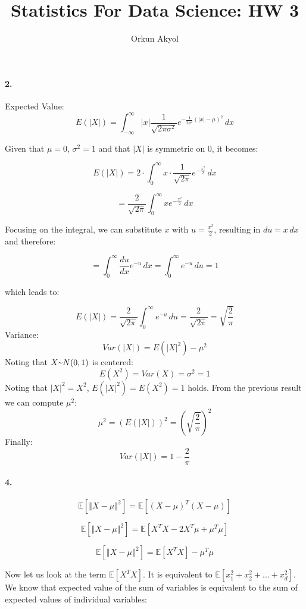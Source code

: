 \documentclass[10pt,letterpaper]{article}
\author{Orkun Akyol}
\title{Statistics For Data Science: HW 3}
\newcommand{\mytexttilde}{\raisebox{0.5ex}{\texttildelow}}
\begin{document}
\paragraph{2.}
Expected Value:
\[
E(|X|) = \int_{-\infty}^{\infty} |x| \frac{1}{\sqrt{2 \pi \sigma^2}} e^{-\frac{1}{2 \sigma^2} (|x| - \mu)^2} \, dx
\]

Given that \( \mu = 0 \), \( \sigma^2 = 1 \) and that \( |X| \) is symmetric on \( 0 \), it becomes:

\[
E(|X|) = 2 \cdot \int_{0}^{\infty} x \cdot \frac{1}{\sqrt{2 \pi}} e^{-\frac{x^2}{2}} \, dx
\]

\[
= \frac{2}{\sqrt{2 \pi}} \int_{0}^{\infty} x e^{-\frac{x^2}{2}} \, dx
\]

Focusing on the integral, we can substitute \(x\) with \( u = \frac{x^2}{2} \), resulting in \(du = x\, dx\) and therefore:

\[
= \int_{0}^{\infty} \frac{du}{dx} e^{-u} \, dx = \int_{0}^{\infty} e^{-u} \, du = 1
\]

which leads to:

\[
E(|X|) = \frac{2}{\sqrt{2 \pi}} \int_{0}^{\infty} e^{-u} \, du = \frac{2}{\sqrt{2 \pi}} = \sqrt{\frac{2}{\pi}} 
\]  
Variance:
\[
Var(|X|) = E(|X|^2) - \mu^2
\]
Noting that $X\mytexttilde N(0,1)$ is centered: 
\[
E(X^2)=Var(X)=\sigma^2=1
\]
Noting that \(|X|^2=X^2\), \(E(|X|^2)=E(X^2)=1\) holds.
From the previous result we can compute \(\mu^2\):
\[
\mu^2 = (E(|X|))^2 =(\sqrt{\frac{2}{\pi}})^2
\]
Finally:
\[
Var(|X|)=1-\frac{2}{\pi}
\]

\paragraph{4.}

    \begin{equation}
        \mathbb{E}[\left \Vert X-\mu \right \Vert ^2] = 
        \mathbb{E}[(X-\mu)^T(X-\mu)]
    \end{equation}
    
    \begin{equation}
       \mathbb{E}[\left \Vert X-\mu \right \Vert ^2] = 
       \mathbb{E}[X^TX - 2X^T\mu + \mu^T\mu]
    \end{equation}

    \begin{equation}
       \mathbb{E}[\left \Vert X-\mu \right \Vert ^2] = 
       \mathbb{E}[X^TX] - \mu^T\mu
    \end{equation}

Now let us look at the term $\mathbb{E}[X^TX]$. It is equivalent to $\mathbb{E}[x_1^2 + x_2^2 + ... + x_d^2]$. We know that expected value of the sum of variables is equivalent to the sum of expected values of individual variables: 
\end{document}
